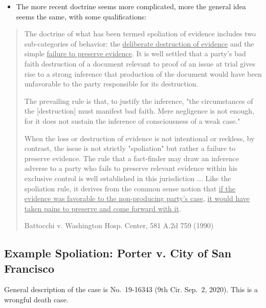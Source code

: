 \documentclass[
  10pt,
  dvipsnames,enabledeprecatedfontcommands]{scrartcl}
\providecommand{\tightlist}{%
  \setlength{\itemsep}{0pt}\setlength{\parskip}{0pt}}
\begin{document}

\begin{itemize}
\tightlist
\item
  The more recent doctrine seems more complicated, more the general idea
  seems the same, with some qualifications:
\end{itemize}

\begin{quote}
The doctrine of what has been termed spoliation of evidence includes two sub-categories of behavior: the \underline{deliberate destruction of evidence} and the simple \underline{failure to preserve evidence}. It is well settled that a party's bad faith destruction of a document relevant to proof of an issue at trial gives rise to a strong inference that production of the document would have been unfavorable to the party responsible for its destruction. 

The prevailing rule is that, to justify the inference, "the circumstances of the [destruction] must manifest bad faith. Mere negligence is not enough, for it does not sustain the inference of consciousness of a weak case." 

When the loss or destruction of evidence is not intentional or reckless, by contrast, the issue is not strictly "spoliation" but rather a failure to preserve evidence. The rule that a fact-finder may draw an inference adverse to a party who fails to preserve relevant evidence within his exclusive control is well established in this jurisdiction ... Like the spoliation rule, it derives from the common sense notion that \underline{if the evidence was favorable to the non-producing party's case}, \underline{it would have taken pains to preserve and come forward with it}.

Battocchi v. Washington Hosp. Center, 581 A.2d 759 (1990)
\end{quote}

\hypertarget{example-spoliation-porter-v.-city-of-san-francisco}{%
\subsection{Example Spoliation: Porter v. City of San
Francisco}\label{example-spoliation-porter-v.-city-of-san-francisco}}

General description of the case is No.~19-16343 (9th Cir. Sep.~2, 2020).
This is a wrongful death case.
\end{document}
